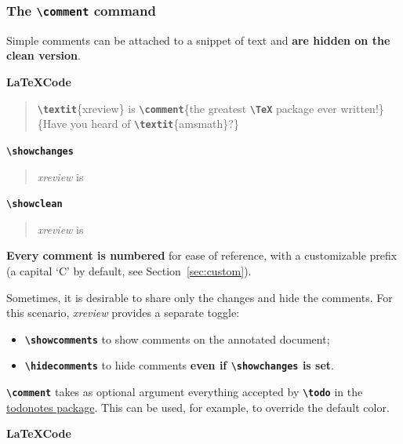 \documentclass[a4paper]{ltxdoc}
\newcommand{\writecommand}[1]{\texttt{\textbf{{\textbackslash#1}}}}
\newcommand{\writearg}[1]{\{#1\}}
\begin{document}
\subsubsection{The \writecommand{comment} command}

Simple comments can be attached to a snippet of text and \textbf{are hidden on the clean version}. 

\textbf{\LaTeX Code}

\begin{quote}
\writecommand{textit}\writearg{xreview} is \writecommand{comment}\writearg{the greatest \writecommand{TeX} package ever written!}\writearg{Have you heard of \writecommand{textit}\writearg{amsmath}?}
\end{quote}

\writecommand{showchanges}
\showchanges

\begin{quote}
\textit{xreview} is 
\end{quote}

\writecommand{showclean}
\showclean

\begin{quote}
\textit{xreview} is 
\end{quote} \addtocounter{commentcounter}{-1}

\showchanges

\textbf{Every comment is numbered} for ease of reference, with a customizable prefix (a capital `C' by default, see Section~\ref{sec:custom}).

Sometimes, it is desirable to share only the changes and hide the comments. For this scenario, \textit{xreview} provides a separate toggle:
\begin{itemize}
    \item \writecommand{showcomments} to show comments on the annotated document;
    \item \writecommand{hidecomments} to hide comments \textbf{even if \writecommand{showchanges} is set}.
\end{itemize}

\writecommand{comment} takes as optional argument everything accepted by \writecommand{todo} in the \href{https://ctan.org/pkg/todonotes?lang=en}{todonotes package}. This can be used, for example, to override the default color.

\textbf{\LaTeX Code}
\end{document}
